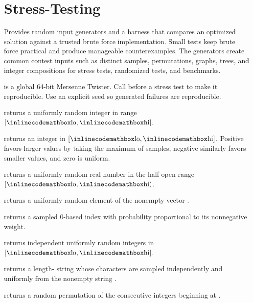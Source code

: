 \section{\texorpdfstring{Stress-Testing}{8.4 Stress-Testing}}
\setcounter{section}{4}
\label{sec:8.4}
Provides random input generators and a harness that compares an optimized solution against a trusted brute force implementation. Small tests keep brute force practical and produce manageable counterexamples. The generators create common contest inputs such as distinct samples, permutations, graphs, trees, and integer compositions for stress tests, randomized tests, and benchmarks.

\begin{compactitem}
  \item {} is a global 64-bit Mersenne Twister. Call  before a stress test to make it reproducible. Use an explicit seed so generated failures are reproducible.
  \item {} returns a uniformly random integer in range $[{\inlinecodemath{lo}}, {\inlinecodemath{hi}}]$.
  \item {} returns an integer in $[{\inlinecodemath{lo}}, {\inlinecodemath{hi}}]$. Positive  favors larger values by taking the maximum of  samples, negative  similarly favors smaller values, and zero is uniform.
  \item {} returns a uniformly random real number in the half-open range $[{\inlinecodemath{lo}}, {\inlinecodemath{hi}})$.
  \item {} returns a uniformly random element of the nonempty vector .
  \item {} returns a sampled 0-based index with probability proportional to its nonnegative weight.
  \item {} returns  independent uniformly random integers in $[{\inlinecodemath{lo}}, {\inlinecodemath{hi}}]$.
  \item {} returns a length- string whose characters are sampled independently and uniformly from the nonempty string .
  \item {} returns a random permutation of the  consecutive integers beginning at .

\end{compactitem}
